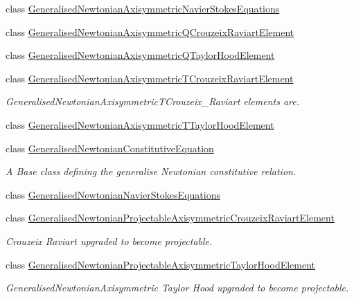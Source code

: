 \begin{DoxyCompactItemize}
class \hyperlink{classoomph_1_1GeneralisedNewtonianAxisymmetricNavierStokesEquations}{Generalised\+Newtonian\+Axisymmetric\+Navier\+Stokes\+Equations}
\item 
class \hyperlink{classoomph_1_1GeneralisedNewtonianAxisymmetricQCrouzeixRaviartElement}{Generalised\+Newtonian\+Axisymmetric\+Q\+Crouzeix\+Raviart\+Element}
\item 
class \hyperlink{classoomph_1_1GeneralisedNewtonianAxisymmetricQTaylorHoodElement}{Generalised\+Newtonian\+Axisymmetric\+Q\+Taylor\+Hood\+Element}
\item 
class \hyperlink{classoomph_1_1GeneralisedNewtonianAxisymmetricTCrouzeixRaviartElement}{Generalised\+Newtonian\+Axisymmetric\+T\+Crouzeix\+Raviart\+Element}
\begin{DoxyCompactList}\small\item\em Generalised\+Newtonian\+Axisymmetric\+T\+Crouzeix\+\_\+\+Raviart elements are. \end{DoxyCompactList}\item 
class \hyperlink{classoomph_1_1GeneralisedNewtonianAxisymmetricTTaylorHoodElement}{Generalised\+Newtonian\+Axisymmetric\+T\+Taylor\+Hood\+Element}
\item 
class \hyperlink{classoomph_1_1GeneralisedNewtonianConstitutiveEquation}{Generalised\+Newtonian\+Constitutive\+Equation}
\begin{DoxyCompactList}\small\item\em A Base class defining the generalise Newtonian constitutive relation. \end{DoxyCompactList}\item 
class \hyperlink{classoomph_1_1GeneralisedNewtonianNavierStokesEquations}{Generalised\+Newtonian\+Navier\+Stokes\+Equations}
\item 
class \hyperlink{classoomph_1_1GeneralisedNewtonianProjectableAxisymmetricCrouzeixRaviartElement}{Generalised\+Newtonian\+Projectable\+Axisymmetric\+Crouzeix\+Raviart\+Element}
\begin{DoxyCompactList}\small\item\em Crouzeix Raviart upgraded to become projectable. \end{DoxyCompactList}\item 
class \hyperlink{classoomph_1_1GeneralisedNewtonianProjectableAxisymmetricTaylorHoodElement}{Generalised\+Newtonian\+Projectable\+Axisymmetric\+Taylor\+Hood\+Element}
\begin{DoxyCompactList}\small\item\em Generalised\+Newtonian\+Axisymmetric Taylor Hood upgraded to become projectable. \end{DoxyCompactList}\item 

\end{DoxyCompactItemize}
